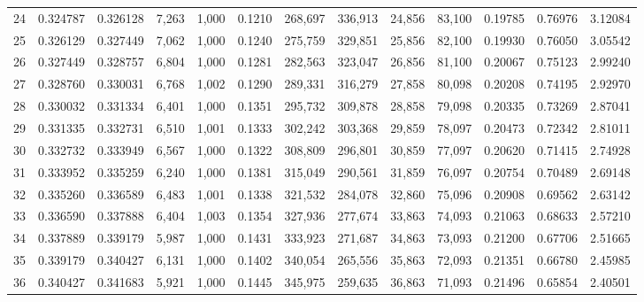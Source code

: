 \begin{tabular}{rrrrrrrrrrrrr}
24  &  0.324787 &  0.326128 &   7,263 &  1,000 &                                     0.1210 &  268,697 &  336,913 &   24,856 &   83,100 &  0.19785 &  0.76976 &  3.12084 \\
25  &  0.326129 &  0.327449 &   7,062 &  1,000 &                                     0.1240 &  275,759 &  329,851 &   25,856 &   82,100 &  0.19930 &  0.76050 &  3.05542 \\
26  &  0.327449 &  0.328757 &   6,804 &  1,000 &                                     0.1281 &  282,563 &  323,047 &   26,856 &   81,100 &  0.20067 &  0.75123 &  2.99240 \\
27  &  0.328760 &  0.330031 &   6,768 &  1,002 &                                     0.1290 &  289,331 &  316,279 &   27,858 &   80,098 &  0.20208 &  0.74195 &  2.92970 \\
28  &  0.330032 &  0.331334 &   6,401 &  1,000 &                                     0.1351 &  295,732 &  309,878 &   28,858 &   79,098 &  0.20335 &  0.73269 &  2.87041 \\
29  &  0.331335 &  0.332731 &   6,510 &  1,001 &                                     0.1333 &  302,242 &  303,368 &   29,859 &   78,097 &  0.20473 &  0.72342 &  2.81011 \\
30  &  0.332732 &  0.333949 &   6,567 &  1,000 &                                     0.1322 &  308,809 &  296,801 &   30,859 &   77,097 &  0.20620 &  0.71415 &  2.74928 \\
31  &  0.333952 &  0.335259 &   6,240 &  1,000 &                                     0.1381 &  315,049 &  290,561 &   31,859 &   76,097 &  0.20754 &  0.70489 &  2.69148 \\
32  &  0.335260 &  0.336589 &   6,483 &  1,001 &                                     0.1338 &  321,532 &  284,078 &   32,860 &   75,096 &  0.20908 &  0.69562 &  2.63142 \\
33  &  0.336590 &  0.337888 &   6,404 &  1,003 &                                     0.1354 &  327,936 &  277,674 &   33,863 &   74,093 &  0.21063 &  0.68633 &  2.57210 \\
34  &  0.337889 &  0.339179 &   5,987 &  1,000 &                                     0.1431 &  333,923 &  271,687 &   34,863 &   73,093 &  0.21200 &  0.67706 &  2.51665 \\
35  &  0.339179 &  0.340427 &   6,131 &  1,000 &                                     0.1402 &  340,054 &  265,556 &   35,863 &   72,093 &  0.21351 &  0.66780 &  2.45985 \\
36  &  0.340427 &  0.341683 &   5,921 &  1,000 &                                     0.1445 &  345,975 &  259,635 &   36,863 &   71,093 &  0.21496 &  0.65854 &  2.40501 \\

\end{tabular}
